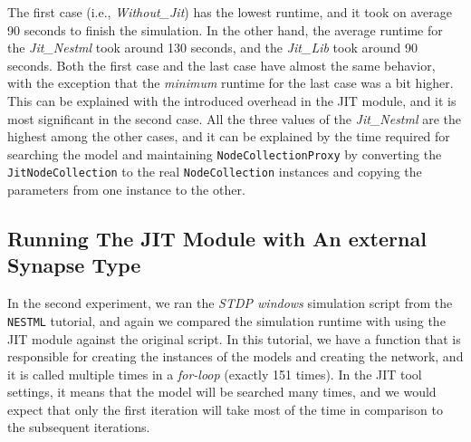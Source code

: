 The first case (i.e., \emph{Without\_Jit}) has the lowest runtime, and it took on average 90 seconds to finish the simulation. In the other hand, the average runtime for the \emph{Jit\_Nestml} took around 130 seconds, and the \emph{Jit\_Lib} took around 90 seconds.  Both the first case and the last case have almost the same behavior, with the exception that the \emph{minimum} runtime for the last case was a bit higher. This can be explained with the introduced overhead in the JIT module, and it is most significant in the second case. All the three values of the \emph{Jit\_Nestml} are the highest among the other cases, and it can be explained by the time required for searching the model and maintaining \texttt{NodeCollectionProxy} by converting the \texttt{JitNodeCollection} to the real \texttt{NodeCollection} instances and copying the parameters from one instance to the other.


\subsection*{Running The JIT Module with An external Synapse Type}

In the second experiment, we ran the \emph{STDP windows} simulation script from the \texttt{NESTML} tutorial, and again we compared the simulation runtime with using the JIT module against the original script. In this tutorial, we have a function that is responsible for creating the instances of the models and creating the network, and it is called multiple times in a \emph{for-loop} (exactly 151 times). In the JIT tool settings, it means that the model will be searched many times, and we would expect that only the first iteration will take most of the time in comparison to the subsequent iterations. 

